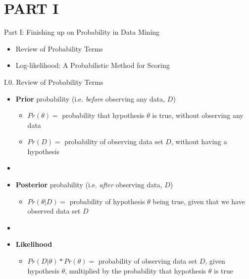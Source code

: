 \documentclass[handout]{beamer}
\newcommand{\stronger}[1]{\textbf{\color{purple} #1}}
\begin{document}
\section{PART I}
\begin{frame}{Part I: Finishing up on Probability in Data Mining}
\begin{itemize}
\item[I.0.] Review of Probability Terms 
\item[I.1.] Log-likelihood: A Probabilistic Method for Scoring
\end{itemize}
\end{frame}
\begin{frame}{I.0. Review of Probability Terms}
\begin{itemize}
\item \stronger{Prior} probability (i.e. \emph{before} observing any data, $D$)
	\begin{itemize}
	\item $Pr(\theta) = $ probability that hypothesis $\theta$ is true, without observing any data\\
	\item $Pr(D) = $ probability of observing data set $D$, without having a hypothesis\\
	\end{itemize}
%
\item[]
\item \stronger{Posterior} probability (i.e. \emph{after} observing data, $D$)
	\begin{itemize}
	\item $Pr(\theta|D) = $ probability of hypothesis $\theta$ being true, given that we have observed data set $D$
	\end{itemize}
%
\item[]
\item \stronger{Likelihood}
	\begin{itemize}
	\item $Pr(D|\theta) * Pr(\theta) = $ probability of observing data set $D$, given hypothesis $\theta$, multiplied by the probability that hypothesis $\theta$ is true
	\end{itemize}
%
\end{itemize}
\end{frame}
\end{document}
